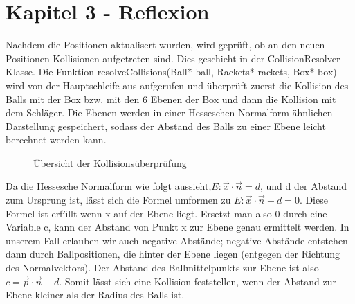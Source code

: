 \section{Kapitel 3 - Reflexion}
\label{Kapitel_4_-_Unterkapitel_2}

Nachdem die Positionen aktualisert wurden, wird geprüft, ob an den neuen Positionen Kollisionen aufgetreten sind. Dies geschieht in der CollisionResolver-Klasse. Die Funktion resolveCollisions(Ball* ball, Rackets* rackets, Box* box) wird von der Hauptschleife aus aufgerufen und überprüft zuerst die Kollision des Balls mit der Box bzw. mit den 6 Ebenen der Box und dann die Kollision mit dem Schläger.
Die Ebenen werden in einer Hesseschen Normalform ähnlichen Darstellung gespeichert, sodass der Abstand des Balls zu einer Ebene leicht berechnet werden kann.

\begin{figure}[h]
    \caption[Testbilder]{Übersicht der Kollisionsüberprüfung}
        \label{fig_testbild}
\end{figure} 

Da die Hessesche Normalform wie folgt aussieht,$ E: \vec x \cdot \vec n  = d $, und d der Abstand zum Ursprung ist, lässt sich die Formel umformen zu $ E: \vec x \cdot \vec n  - d = 0$. Diese Formel ist erfüllt wenn x auf der Ebene liegt. Ersetzt man also 0 durch eine Variable c, kann der Abstand von Punkt x zur Ebene genau ermittelt werden. In unserem Fall erlauben wir auch negative Abstände; negative Abstände entstehen dann durch Ballpositionen, die hinter der Ebene liegen (entgegen der Richtung des Normalvektors).
Der Abstand des Ballmittelpunkts zur Ebene ist also $c = \vec p\cdot \vec n - d $. Somit lässt sich eine Kollision feststellen, wenn der Abstand zur Ebene kleiner als der Radius des Balls ist.

